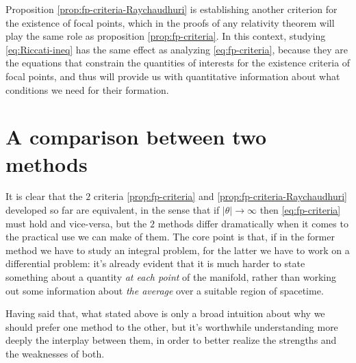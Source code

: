 	Proposition \ref{prop:fp-criteria-Raychaudhuri} is establishing another criterion for the existence of focal points, which in the proofs of any relativity theorem will play the same role as proposition \ref{prop:fp-criteria}. In this context, studying \ref{eq:Riccati-ineq} has the same effect as analyzing \ref{eq:fp-criteria}, because they are the equations that constrain the quantities of interests for the existence criteria of focal points, and thus will provide us with quantitative information about what conditions we need for their formation.
	
	\section{A comparison between two methods}
	\label{sec:comparison-2-methods}
	It is clear that the \(2\) criteria \ref{prop:fp-criteria} and \ref{prop:fp-criteria-Raychaudhuri} developed so far are equivalent, in the sense that if \(\vert\theta\vert \rightarrow \infty\) then \eqref{eq:fp-criteria} must hold and vice-versa, but the \(2\) methods differ dramatically when it comes to the practical use we can make of them. The core point is that, if in the former method we have to study an integral problem, for the latter we have to work on a differential problem: it's already evident that it is much harder to state something about a quantity \emph{at each point} of the manifold, rather than working out some information about \emph{the average} over a suitable region of spacetime.
	
	Having said that, what stated above is only a broad intuition about why we should prefer one method to the other, but it's worthwhile understanding more deeply the interplay between them, in order to better realize the strengths and the weaknesses of both.
	
